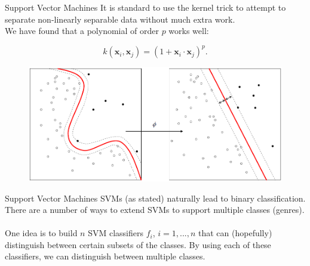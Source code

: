 \documentclass[xcolor=dvipsnames,t]{beamer} %
\begin{document}
\begin{frame}{Support Vector Machines}
It is standard to use the kernel trick to attempt to separate non-linearly separable data without much extra work.\\

We have found that a polynomial of order $p$ works well:

\[ k(\mathbf{x}_i,\mathbf{x}_j) = \left(1 + \mathbf{x}_i\cdot\mathbf{x}_j\right)^p. \] 

\begin{figure}[b]
   \centering
   \includegraphics[width=\textwidth]{figures/Kernel_Machine_public.png}
\end{figure}
\end{frame}

\begin{frame}{Support Vector Machines}
   SVMs (as stated) naturally lead to binary classification.  There are a number of ways to extend SVMs to support multiple classes (genres).\\

   ~\\
   One idea is to build $n$ SVM classifiers $f_i$, $i=1,...,n$ that can (hopefully) distinguish between certain subsets of the classes.  By using each of these classifiers, we can distinguish between multiple classes.\\
   
\end{frame}
\end{document}
